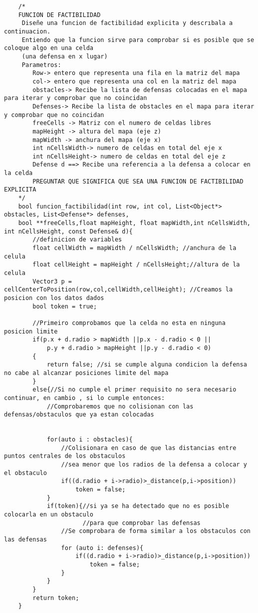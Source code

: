
\begin{lstlisting}
    /*
    FUNCION DE FACTIBILIDAD
     Diseñe una funcion de factibilidad explicita y descrıbala a continuacion.
     Entiendo que la funcion sirve para comprobar si es posible que se coloque algo en una celda
     (una defensa en x lugar)
     Parametros: 
        Row-> entero que representa una fila en la matriz del mapa
        col-> entero que representa una col en la matriz del mapa
        obstacles-> Recibe la lista de defensas colocadas en el mapa para iterar y comprobar que no coincidan
        Defenses-> Recibe la lista de obstacles en el mapa para iterar y comprobar que no coincidan
        freeCells -> Matriz con el numero de celdas libres
        mapHeight -> altura del mapa (eje z)
        mapWidth -> anchura del mapa (eje x)
        int nCellsWidth-> numero de celdas en total del eje x
        int nCellsHeight-> numero de celdas en total del eje z
        Defense d ==> Recibe una referencia a la defensa a colocar en la celda
        PREGUNTAR QUE SIGNIFICA QUE SEA UNA FUNCION DE FACTIBILIDAD EXPLICITA
    */
    bool funcion_factibilidad(int row, int col, List<Object*> obstacles, List<Defense*> defenses,
    bool **freeCells,float mapHeight, float mapWidth,int nCellsWidth, int nCellsHeight, const Defense& d){
        //definicion de variables
        float cellWidth = mapWidth / nCellsWidth; //anchura de la celula
        float cellHeight = mapHeight / nCellsHeight;//altura de la celula
        Vector3 p = cellCenterToPosition(row,col,cellWidth,cellHeight); //Creamos la posicion con los datos dados
        bool token = true;
    
        //Primeiro comprobamos que la celda no esta en ninguna posicion limite
        if(p.x + d.radio > mapWidth ||p.x - d.radio < 0 ||
            p.y + d.radio > mapHeight ||p.y - d.radio < 0)
        {
            return false; //si se cumple alguna condicion la defensa no cabe al alcanzar posiciones limite del mapa
        }    
        else{//Si no cumple el primer requisito no sera necesario continuar, en cambio , si lo cumple entonces:
            //Comprobaremos que no colisionan con las defensas/obstaculos que ya estan colocadas
            
            
            for(auto i : obstacles){
                //Colisionara en caso de que las distancias entre puntos centrales de los obstaculos
                //sea menor que los radios de la defensa a colocar y el obstaculo
                if((d.radio + i->radio)>_distance(p,i->position))
                    token = false;
            }
            if(token){//si ya se ha detectado que no es posible colocarla en un obstaculo
                      //para que comprobar las defensas
                //Se comprobara de forma similar a los obstaculos con las defensas
                for (auto i: defenses){
                    if((d.radio + i->radio)>_distance(p,i->position))
                        token = false;
                }
            }
        }
        return token;      
    }
\end{lstlisting}